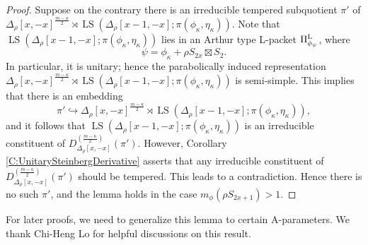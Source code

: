 \documentclass[11pt,letterpaper]{amsart}
\theoremstyle{plain}
\numberwithin{theorem}{section}
\numberwithin{equation}{subsection}
\theoremstyle{remark}
\newcommand{\LS}{\operatorname{LS}} %
\def\LP{\Pi^{\rm L}} %
\begin{document}
\begin{proof}
\vskip 5pt

Suppose on the contrary there is an irreducible tempered subquotient $\pi'$ of $\Delta_\rho[x,-x]^{\frac{m-\kappa}{2}}\rtimes \LS\left(\Delta_\rho\left[x-1,-x\right];\pi\left(\phi_\kappa,\eta_\kappa\right)\right)$. Note that $\LS\left(\Delta_\rho\left[x-1,-x\right];\pi\left(\phi_\kappa,\eta_\kappa\right)\right)$ lies in an Arthur type L-packet $\LP_{\phi_\psi}$, where
\[
    \psi = \phi_\kappa + \rho S_{2x}\boxtimes S_2.
\] 
In particular, it is unitary; hence the parabolically induced representation $\Delta_\rho[x,-x]^{\frac{m-\kappa}{2}}\rtimes \LS\left(\Delta_\rho\left[x-1,-x\right];\pi\left(\phi_\kappa,\eta_\kappa\right)\right)$ is semi-simple. This implies that there is an embedding
\[
    \pi' \hookrightarrow \Delta_\rho[x,-x]^{\frac{m-\kappa}{2}}\rtimes \LS\left(\Delta_\rho\left[x-1,-x\right];\pi\left(\phi_\kappa,\eta_\kappa\right)\right),
\]
and it follows that $\LS\left(\Delta_\rho\left[x-1,-x\right];\pi\left(\phi_\kappa,\eta_\kappa\right)\right)$ is an irreducible constituent of $D_{\Delta_\rho[x,-x]}^{(\frac{m-\kappa}{2})}\left(\pi'\right)$. However, Corollary \ref{C:UnitarySteinbergDerivative} asserts that any irreducible constituent of $D_{\Delta_\rho[x,-x]}^{(\frac{m-\kappa}{2})}\left(\pi'\right)$ should be tempered. This leads to a contradiction. Hence there is no such $\pi'$, and the lemma holds in the case $m_{\phi}\left(\rho S_{2x+1}\right)>1$.

\end{proof}

\vskip 5pt

For later proofs, we need to generalize this lemma to certain A-parameters. We thank Chi-Heng Lo for helpful discussions on this result.
\end{document}
